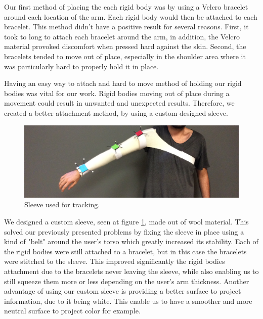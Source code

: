 Our first method of placing the each rigid body was by using a Velcro bracelet around each location of the arm. 
Each rigid body would then be attached to each bracelet. This method didn't have a positive result for several reasons. 
First, it took to long to attach each bracelet around the arm, in addition, the Velcro material provoked discomfort when pressed hard against the skin. 
Second, the bracelets tended to move out of place, especially in the shoulder area where it was particularly hard to properly hold it in place.

Having an easy way to attach and hard to move method of holding our rigid bodies was vital for our work. 
Rigid bodies moving out of place during a movement could result in unwanted and unexpected results. 
Therefore, we created a better attachment method, by using a custom designed sleeve.


\begin{figure}[!t]
    \begin{center}
        \includegraphics[width=\textwidth]{imgs/impl/sleevewearable}
    \end{center}
    \caption{Sleeve used for tracking.}
    \label{fig:sleevewearable}
\end{figure}

We designed a custom sleeve, seen at figure \ref{fig:sleevewearable}, made out of wool material. 
This solved our previously presented problems by fixing the sleeve in place using a kind of "belt" around the user's torso which greatly increased its stability. 
Each of the rigid bodies were still attached to a bracelet, but in this case the bracelets were stitched to the sleeve. 
This improved significantly the rigid bodies attachment due to the bracelets never leaving the sleeve, 
while also enabling us to still squeeze them more or less depending on the user's arm thickness.
Another advantage of using our custom sleeve is providing a better surface to project information, due to it being white. This enable us to have a smoother and more neutral surface to project color for example.  

